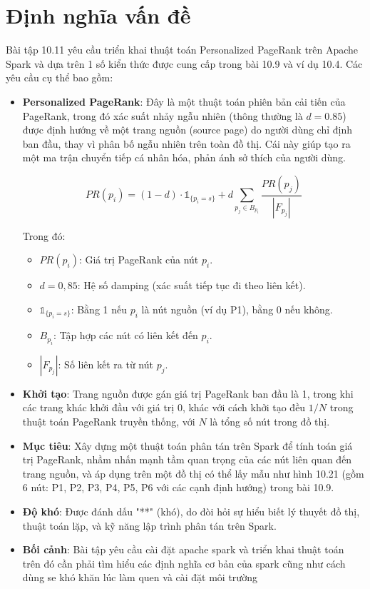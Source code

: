 \documentclass[conference]{IEEEtran}
\begin{document}
\section{Định nghĩa vấn đề}
Bài tập 10.11 yêu cầu triển khai thuật toán Personalized PageRank trên Apache Spark và dựa trên 1 số kiển thức được cung cấp trong bài 10.9 và ví dụ 10.4. Các yêu cầu cụ thể bao gồm:
\begin{itemize}
    \item \textbf{Personalized PageRank}: Đây là một thuật toán phiên bản cải tiến của PageRank, trong đó xác suất nhảy ngẫu nhiên (thông thường là \(d = 0.85\)) được định hướng về một trang nguồn (source page) do người dùng chỉ định ban đầu, thay vì phân bố ngẫu nhiên trên toàn đồ thị. Cái này giúp tạo ra một ma trận chuyển tiếp cá nhân hóa, phản ánh sở thích của người dùng.
    
\begin{equation}
PR(p_i) = (1 - d) \cdot \mathbb{1}_{\{p_i = s\}} + d \sum_{p_j \in B_{p_i}} \frac{PR(p_j)}{|F_{p_j}|}
\end{equation}

Trong đó:
\begin{itemize}
  \item $PR(p_i)$: Giá trị PageRank của nút $p_i$.
  \item $d = 0{,}85$: Hệ số damping (xác suất tiếp tục đi theo liên kết).
  \item $\mathbb{1}_{\{p_i = s\}}$: Bằng 1 nếu $p_i$ là nút nguồn (ví dụ P1), bằng 0 nếu không.
  \item $B_{p_i}$: Tập hợp các nút có liên kết đến $p_i$.
  \item $|F_{p_j}|$: Số liên kết ra từ nút $p_j$.
\end{itemize}

\vspace{0.5em}



    \item \textbf{Khởi tạo}: Trang nguồn được gán giá trị PageRank ban đầu là 1, trong khi các trang khác khởi đầu với giá trị 0, khác với cách khởi tạo đều \(1/N\) trong thuật toán PageRank truyền thống, với \(N\) là tổng số nút trong đồ thị.\\
    \item \textbf{Mục tiêu}: Xây dựng một thuật toán phân tán trên Spark để tính toán giá trị PageRank, nhầm nhấn mạnh tầm quan trọng của các nút liên quan đến trang nguồn, và áp dụng trên một đồ thị có thể lấy mẫu như hình 10.21 (gồm 6 nút: P1, P2, P3, P4, P5, P6 với các cạnh định hướng) trong bài 10.9.\\
    \item \textbf{Độ khó}: Được đánh dấu "**" (khó), do đòi hỏi sự hiểu biết lý thuyết đồ thị, thuật toán lặp, và kỹ năng lập trình phân tán trên Spark.\\
    \item \textbf{Bối cảnh}: Bài tập yêu cầu cài đặt apache spark và triển khai thuật toán trên đó cần phải tìm hiểu các định nghĩa cơ bản của spark cũng như cách dùng se khó khăn lúc làm quen và cài đặt môi trường
\end{itemize}
\end{document}
